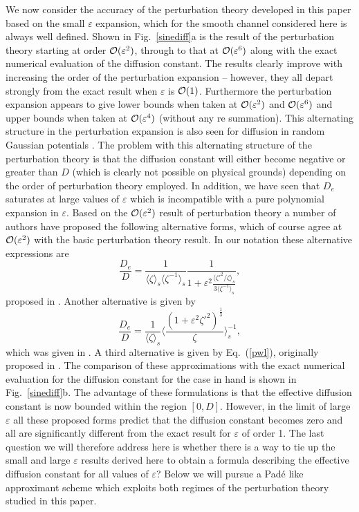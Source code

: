 \documentclass[pre,showpacs,preprintnumbers,amsmath,amssymb,superscriptaddress]{revtex4-1}
\begin{document}
{{We now consider the accuracy of the perturbation theory developed in this paper based on 
the small $\varepsilon$ expansion, which for the smooth channel considered here is always
well defined. Shown in Fig.~\ref{sinediff}a is the result of the perturbation theory starting at order
${\cal O}(\varepsilon^2)$, through to that at ${\cal O}(\varepsilon^6)$ along with the exact numerical evaluation of the diffusion constant. The results clearly improve with increasing the order of the perturbation
expansion -- however, they all depart strongly from the exact result when $\varepsilon$ is ${\cal O}(1)$. Furthermore the perturbation expansion appears to give lower bounds when 
taken at ${\cal O}(\varepsilon^2)$ and ${\cal O}(\varepsilon^6)$ and upper bounds when taken at 
${\cal O}(\varepsilon^4)$ (without any re summation). This alternating structure in the perturbation expansion is also seen for diffusion in random Gaussian potentials \cite{dea94, dea95}. The problem with this alternating structure of the perturbation theory is that the diffusion constant will either become negative or greater than $D$ (which is clearly not possible on physical grounds) depending on the order of perturbation theory employed. In addition, we have seen that $D_e$ saturates at large values of $\varepsilon$ 
which is incompatible with a pure polynomial expansion in $\varepsilon$. Based on 
the ${\cal O}(\varepsilon^2)$ result of perturbation theory a number of authors have proposed 
the following alternative forms, which of course agree at ${\cal O}(\varepsilon^2)$ with the basic perturbation theory result. In our notation these alternative expressions are 
\begin{equation}
\frac{D_e}{D} = \frac{1}{\langle \zeta \rangle_s \langle \zeta^{-1} \rangle_s} \frac{1}{1 + \varepsilon^2 \frac{\langle \zeta'^2/\zeta\rangle_s}{3 \langle \zeta^{-1} \rangle_s}},\label{rszw}
\end{equation}
proposed in \cite{zwa1991}. Another alternative is given by
\begin{equation}
\frac{D_e}{D} = \frac{1}{\langle \zeta \rangle_s}\langle \frac{(1+\varepsilon^2\zeta'^2)^{\frac{1}{3}}}{\zeta}\rangle_s^{-1},\label{rsrr}
\end{equation}
which was given in \cite{reg2001}. A third alternative is given by Eq.~(\ref{pwl}), originally proposed in \cite{kal2006}. The comparison of these approximations with the exact numerical evaluation for the diffusion constant for the case in hand is shown in Fig.~\ref{sinediff}b. The advantage of these formulations is that the effective diffusion constant 
is now bounded within the region $[0,D]$. However, in the limit of large $\varepsilon$ all these
proposed forms predict that the diffusion constant becomes zero and all are significantly different from the exact result for $\varepsilon$ of order 1. The last question we will therefore address here is whether there is a way to tie up the small and large $\varepsilon$ results derived here to obtain a formula describing the effective diffusion constant for all
values of $\varepsilon$? Below we will pursue a Pad\'e like approximant scheme which
exploits both regimes of the perturbation theory studied in this paper.

}}
\end{document}
